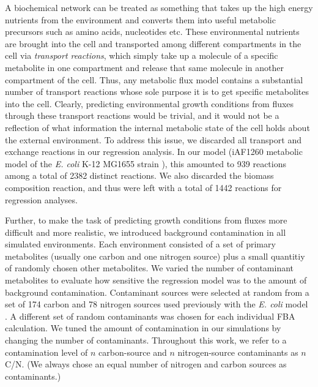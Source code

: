 \documentclass[12pt]{article}
\begin{document}
A biochemical network can be treated as something that takes up the high energy nutrients from the environment and converts them into useful metabolic precursors such as amino acids, nucleotides etc. These environmental nutrients are brought into the cell and transported among different compartments in the cell via \emph{transport reactions}, which simply take up a molecule of a specific metabolite in one compartment and release that same molecule in another compartment of the cell. Thus, any metabolic flux model contains a substantial number of transport reactions whose sole purpose it is to get specific metabolites into the cell. Clearly, predicting environmental growth conditions from fluxes through these transport reactions would be trivial, and it would not be a reflection of what information the internal metabolic state of the cell holds about the external environment. To address this issue, we discarded all transport and exchange reactions in our regression analysis. In our model (iAF1260 metabolic model of the \emph{E. coli} K-12 MG1655 strain \cite{Schellenbergeretal2010}), this amounted to 939 reactions among a total of 2382 distinct reactions. We also discarded the biomass composition reaction, and thus were left with a total of 1442 reactions for regression analyses.

Further, to make the task of predicting growth conditions from fluxes more difficult and more realistic, we introduced background contamination in all simulated environments. Each environment consisted of a set of primary metabolites (usually one carbon and one nitrogen source) plus a small quantitiy of randomly chosen other metabolites. We varied the number of contaminant metabolites to evaluate how sensitive the regression model was to the amount of background contamination. Contaminant sources were selected at random from a set of 174 carbon and 78 nitrogen sources used previously with the \emph{E. coli} model \cite{Feistetal2007}. A different set of random contaminants was chosen for each individual FBA calculation. We tuned the amount of contamination in our simulations by changing the number of contaminants. Throughout this work, we refer to a contamination level of $n$ carbon-source and $n$ nitrogen-source contaminants as $n$ C/N. (We always chose an equal number of nitrogen and carbon sources as contaminants.)
\end{document}
